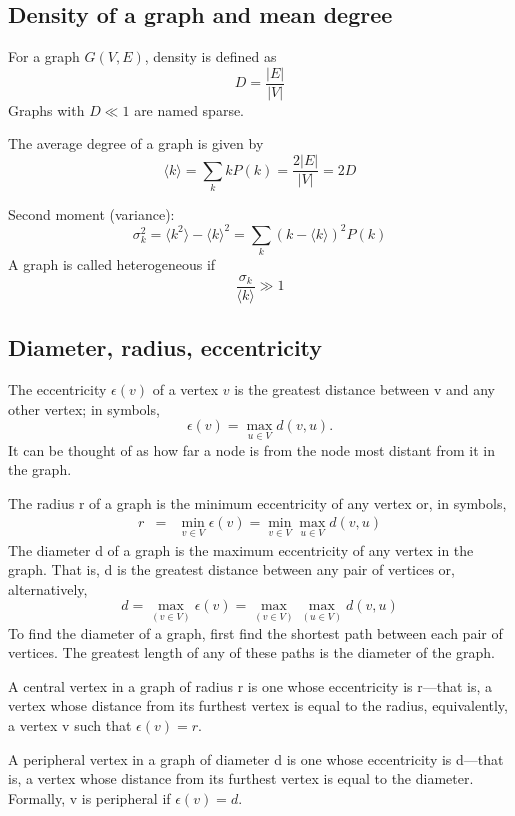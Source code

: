\subsection{Density of a graph and mean degree}
For a graph $G(V,E)$, density is defined as
\[ D = \frac {|E|}{|V|}\]
Graphs with $D \ll 1$ are named sparse.

The average degree of a graph is given by
\[ \langle k \rangle  = \sum_k k P(k) = \frac{2 |E|}{|V|} = 2 D\]

Second moment (variance):
\[ \sigma_k^2 = \langle k^2 \rangle -\langle k \rangle^2  = \sum_k (k -\langle k \rangle)^2 P(k)\]
A graph is called heterogeneous if 
\[\frac {\sigma_k} {\langle k \rangle} \gg 1\]


\subsection{Diameter, radius, eccentricity}

The eccentricity $\epsilon(v)$ of a vertex $v$ is the greatest distance between v and any other vertex; in symbols,
\[   {\displaystyle \epsilon (v)=\max_{u\in V}d(v,u).}
\]
It can be thought of as how far a node is from the node most distant from it in the graph.

The radius r of a graph is the minimum eccentricity of any vertex or, in symbols,
\begin{eqnarray*}
    r &=& \min_{ v \in V} \epsilon (v) = \min_{v \in V} \max_{ u \in V} d ( v , u ) 
\end{eqnarray*}
The diameter d of a graph is the maximum eccentricity of any vertex in the graph. That is, d is the greatest distance between any pair of vertices or, alternatively,
\[
    d = \max\limits_{\left(v \in V \right)}  \epsilon ( v ) = \max\limits_{\left(v \in V \right)}   \max\limits_{\left( u \in V \right)}    d ( v , u ) 
\]
To find the diameter of a graph, first find the shortest path between each pair of vertices. The greatest length of any of these paths is the diameter of the graph.

A central vertex in a graph of radius r is one whose eccentricity is r—that is, a vertex whose distance from its furthest vertex is equal to the radius, equivalently, a vertex v such that $\epsilon(v) = r$.

A peripheral vertex in a graph of diameter d is one whose eccentricity is d—that is, a vertex whose distance from its furthest vertex is equal to the diameter. Formally, v is peripheral if $\epsilon(v) = d$.


